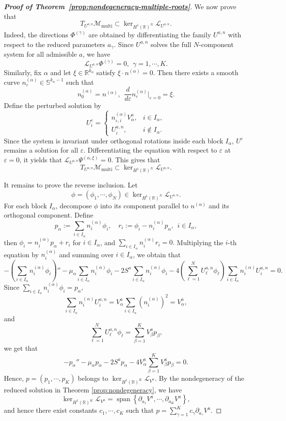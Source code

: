 \documentclass[11pt]{article}
\numberwithin{equation}{section}
\theoremstyle{definition}
\begin{document}
\begin{proof}[\normalfont\bfseries Proof of Theorem~\ref{prop:nondegeneracy-multiple-roots}]
We now prove that
\[
T_{U^{a,n}}\mathcal M_{\mathrm{multi}}
\subset
\ker_{H^1(\mathbb R)^N}\mathcal L_{U^{a,n}} .
\]
Indeed, the directions \(\Phi^{(\gamma)}\) are obtained by differentiating
the family \(U^{a,n}\) with respect to the reduced parameters \(a_\gamma\).
Since \(U^{a,n}\) solves the full \(N\)-component system for all admissible
\(a\), we have
\[
\mathcal L_{U^{a,n}}\Phi^{(\gamma)}=0,
\ \  \gamma=1,\cdots,K.
\]
Similarly, fix $\alpha$ and let
$\xi\in\mathbb R^{k_\alpha}$ satisfy
$\xi\cdot n^{(\alpha)}=0$.
Then there exists a smooth curve
$n_\varepsilon^{(\alpha)}\in\mathbb S^{k_\alpha-1}$
such that
\[
n_0^{(\alpha)}=n^{(\alpha)},
\ \
\frac{d}{d\varepsilon}n_\varepsilon^{(\alpha)}
\Big|_{\varepsilon=0}
=\xi.
\]
Define the perturbed solution by
\[
U_i^\varepsilon
=
\begin{cases}
	n_{\varepsilon,i}^{(\alpha)} V_\alpha^a,
	& i\in I_\alpha,\\
	U_i^{a,n},
	& i\notin I_\alpha.
\end{cases}
\]
Since the system is invariant under orthogonal
rotations inside each block $I_\alpha$,
$U^\varepsilon$ remains a solution for all
$\varepsilon$.
Differentiating the equation with respect to
$\varepsilon$ at $\varepsilon=0$, it
yields that
$
\mathcal L_{U^{a,n}} \Psi^{(\alpha,\xi)}=0.
$
This gives that
\[
T_{U^{a,n}}\mathcal M_{\mathrm{multi}}
\subset
\ker_{H^1(\mathbb R)^N}\mathcal L_{U^{a,n}} .
\]



It remains to prove the reverse inclusion. Let
\[
\phi=(\phi_1,\cdots,\phi_N)
\in
\ker_{H^1(\mathbb R)^N}\mathcal L_{U^{a,n}} .
\]
For each block \(I_\alpha\), decompose \(\phi\) into its component parallel
to \(n^{(\alpha)}\) and its orthogonal component. Define
\[
p_\alpha
:=
\sum_{i\in I_\alpha}n_i^{(\alpha)}\phi_i,\quad r_i
:=
\phi_i-n_i^{(\alpha)}p_\alpha,
\ \  i\in I_\alpha,\]
then
$
\phi_i=n_i^{(\alpha)}p_\alpha+r_i
$ for $i\in I_\alpha$,
and
$
\sum_{i\in I_\alpha}n_i^{(\alpha)}r_i=0.
$
Multiplying the \(i\)-th equation by \(n_i^{(\alpha)}\) and summing over
\(i\in I_\alpha\), we obtain that
\[
-\left(\sum_{i\in I_\alpha}n_i^{(\alpha)}\phi_i\right)''
-\mu_\alpha \sum_{i\in I_\alpha}n_i^{(\alpha)}\phi_i
-2S^a\sum_{i\in I_\alpha}n_i^{(\alpha)}\phi_i
-4\left(\sum_{\ell=1}^N U_\ell^{a,n}\phi_\ell\right)
\sum_{i\in I_\alpha}n_i^{(\alpha)}U_i^{a,n}
=0.
\]
Since
\(
\sum_{i\in I_\alpha}n_i^{(\alpha)}\phi_i=p_\alpha
\),
\[
\sum_{i\in I_\alpha}n_i^{(\alpha)}U_i^{a,n}
=
V_\alpha^a\sum_{i\in I_\alpha}(n_i^{(\alpha)})^2
=
V_\alpha^a,
\]
and
\[
\sum_{\ell=1}^N U_\ell^{a,n}\phi_\ell
=
\sum_{\beta=1}^K V_\beta^a p_\beta,
\]
we get that
\[
-p_\alpha''
-\mu_\alpha p_\alpha
-2S^{a}p_\alpha
-4V_\alpha^a\sum_{\beta=1}^K V_\beta^a p_\beta
=0.
\]
Hence, \(p=(p_1,\cdots,p_K)\) belongs to
\(\ker_{H^1(\mathbb R)^K}\mathcal L_{V^a}\).
By the nondegeneracy of the reduced solution in Theorem \ref{prop:nondegeneracy}, we have
\[
\ker_{H^1(\mathbb R)^K}\mathcal L_{V^a}
=
\operatorname{span}
\left\{
\partial_{a_1}V^a,\cdots,\partial_{a_K}V^a
\right\},
\]
and hence there exist constants \(c_1,\cdots,c_K\) such that
\(
p=\sum_{\gamma=1}^K c_\gamma \partial_{a_\gamma}V^a.
\)



\end{proof}
\end{document}
